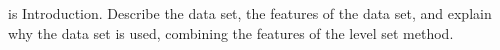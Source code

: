 
 is Introduction. Describe the data set, the features of the data set, and explain why the data set is used, combining the features of the level set method.
